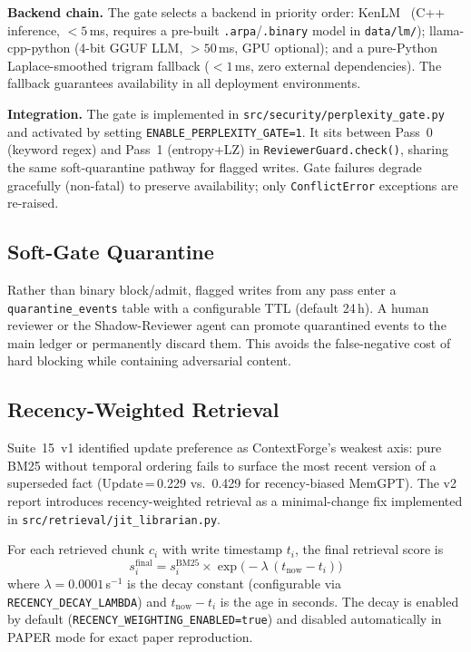 \documentclass[11pt,twocolumn]{article}
\begin{document}
\textbf{Backend chain.}
The gate selects a backend in priority order: KenLM~\cite{heafield2011}
(C++ inference, $<5$\,ms, requires a pre-built \texttt{.arpa}/\texttt{.binary}
model in \texttt{data/lm/}); llama-cpp-python (4-bit GGUF LLM,
$>50$\,ms, GPU optional); and a pure-Python Laplace-smoothed trigram
fallback ($<1$\,ms, zero external dependencies). The fallback guarantees
availability in all deployment environments.

\textbf{Integration.}
The gate is implemented in \texttt{src/security/perplexity\_gate.py} and
activated by setting \texttt{ENABLE\_PERPLEXITY\_GATE=1}. It sits between
Pass~0 (keyword regex) and Pass~1 (entropy+LZ) in
\texttt{ReviewerGuard.check()}, sharing the same soft-quarantine pathway for
flagged writes. Gate failures degrade gracefully (non-fatal) to preserve
availability; only \texttt{ConflictError} exceptions are re-raised.

\subsection{Soft-Gate Quarantine}
\label{sec:quarantine}

Rather than binary block/admit, flagged writes from any pass enter a
\texttt{quarantine\_events} table with a configurable TTL (default 24\,h).
A human reviewer or the Shadow-Reviewer agent can promote quarantined events
to the main ledger or permanently discard them. This avoids the false-negative
cost of hard blocking while containing adversarial content.

\subsection{Recency-Weighted Retrieval}
\label{sec:recency}

Suite~15~v1 identified update preference as ContextForge's weakest axis:
pure BM25 without temporal ordering fails to surface the most recent version
of a superseded fact (Update\,=\,0.229 vs.\ 0.429 for recency-biased MemGPT).
The v2 report introduces recency-weighted retrieval as a minimal-change fix
implemented in \texttt{src/retrieval/jit\_librarian.py}.

For each retrieved chunk $c_i$ with write timestamp $t_i$, the final retrieval
score is
\begin{equation}
  s_i^{\mathrm{final}} = s_i^{\mathrm{BM25}} \times \exp\!\bigl(-\lambda\,(t_{\mathrm{now}} - t_i)\bigr)
  \label{eq:recency}
\end{equation}
where $\lambda = 0.0001$\,s$^{-1}$ is the decay constant (configurable via
\texttt{RECENCY\_DECAY\_LAMBDA}) and $t_{\mathrm{now}} - t_i$ is the age in
seconds.  The decay is enabled by default (\texttt{RECENCY\_WEIGHTING\_ENABLED=true})
and disabled automatically in PAPER mode for exact paper reproduction.
\end{document}
